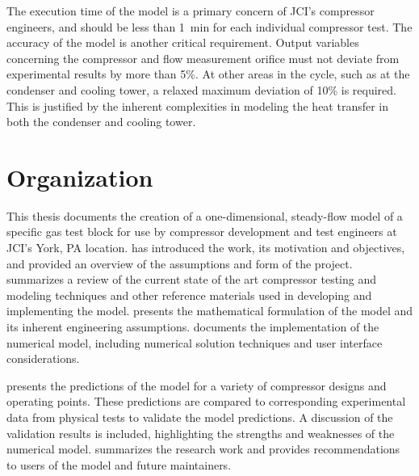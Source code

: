 The execution time of the model is a primary concern of JCI's compressor engineers, 
and should be less than \SI{1}{\minute} for each individual compressor test.
The accuracy of the model is another critical requirement.
Output variables concerning the compressor and flow measurement orifice 
must not deviate from experimental results by more than 5\%.
At other areas in the cycle, such as at the condenser and cooling tower,
a relaxed maximum deviation of 10\% is required.
This is justified by the inherent complexities in modeling the heat transfer
in both the condenser and cooling tower.

\section{Organization} \label{sec:organization}
This thesis documents the creation of a one-dimensional, steady-flow model 
of a specific gas test block for use by compressor 
development and test engineers at JCI's York, PA location.
 has introduced the work, its motivation and objectives,
and provided an overview of the assumptions and form of the project.
 summarizes a review of the current state of the art 
compressor testing and modeling techniques 
and other reference materials used in developing and implementing the model. 
 presents the mathematical formulation of the model 
and its inherent engineering assumptions. 
 documents the implementation of the numerical model, 
including numerical solution techniques and user interface considerations. 

 presents the predictions of the model 
for a variety of compressor designs and operating points. 
These predictions are compared to corresponding experimental data 
from physical tests to validate the model predictions.
A discussion of the validation results is included, 
highlighting the strengths and weaknesses of the numerical model.
 summarizes the research work 
and provides recommendations to users of the model and future maintainers.


